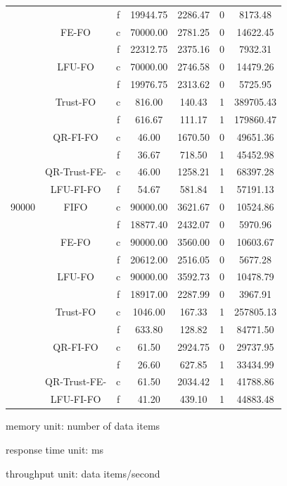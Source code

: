 \begin{center}
\begin{longtable}{|c||c||c|c|c|c|c|}
	      &      & f  & 19944.75 & 2286.47 & 0 & 8173.48 \\     \cline{2-7}
	      & FE-FO & c & 70000.00 & 2781.25 & 0& 14622.45 \\        \cline{3-7}
	      &       & f & 22312.75 & 2375.16 & 0 & 7932.31 \\     \cline{2-7}
	      & LFU-FO & c & 70000.00 & 2746.58 & 0& 14479.26 \\       \cline{3-7}
	      &        & f & 19976.75 & 2313.62 & 0 & 5725.95 \\    \cline{2-7}
	      & Trust-FO & c & 816.00 & 140.43 & 1& 389705.43 \\     \cline{3-7}
	      &          & f & 616.67 & 111.17 & 1 & 179860.47 \\  \cline{2-7}
	      & QR-FI-FO & c & 46.00 & 1670.50 & 0& 49651.36 \\     \cline{3-7}
	      &          & f & 36.67 & 718.50 & 1 & 45452.98 \\  \cline{2-7}
	      & QR-Trust-FE- & c & 46.00 & 1258.21 & 1& 68397.28 \\  \cline{3-7}
	      & LFU-FI-FO    & f & 54.67 & 581.84 & 1 & 57191.13 \\ \hhline{|=#=#=|=|=|=|=|}
	90000 & FIFO & c  & 90000.00 & 3621.67& 0 & 10524.86 \\        \cline{3-7}
	      &      & f  & 18877.40 & 2432.07 & 0 & 5970.96 \\     \cline{2-7}
	      & FE-FO & c & 90000.00 & 3560.00& 0 & 10603.67\\        \cline{3-7}
	      &       & f & 20612.00 & 2516.05 & 0 & 5677.28 \\     \cline{2-7}
	      & LFU-FO & c & 90000.00 & 3592.73& 0 & 10478.79\\       \cline{3-7}
	      &        & f & 18917.00 & 2287.99 & 0 & 3967.91 \\    \cline{2-7}
	      & Trust-FO & c & 1046.00 & 167.33 & 1 & 257805.13\\     \cline{3-7}
	      &          & f & 633.80& 128.82 & 1 & 84771.50 \\  \cline{2-7}
	      & QR-FI-FO & c & 61.50 & 2924.75& 0 & 29737.95\\     \cline{3-7}
	      &          & f & 26.60 & 627.85 & 1 & 33434.99 \\  \cline{2-7}
	      & QR-Trust-FE- & c & 61.50 & 2034.42 & 1 & 41788.86 \\  \cline{3-7}
	      & LFU-FI-FO & f & 41.20 & 439.10 & 1 & 44883.48 \\ 
\end{longtable}
    \begin{tablenotes}
 		\item memory unit: number of data items
 		\item response time unit: ms
 		\item throughput unit: data items/second
    \end{tablenotes}
\end{center}

